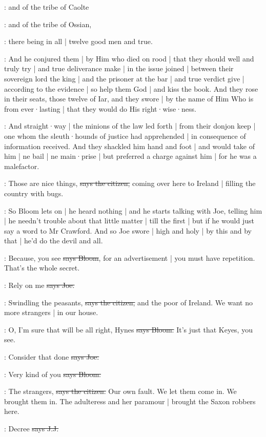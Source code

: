 :
and of the tribe of Caolte

:
and of the tribe of Ossian,

:
there being in all
 |
twelve good men and true.

:
And he conjured them |
by Him who died on rood |
that they should well and truly try |
and true deliverance make |
in the issue joined |
between their sovereign lord the king |
and the prisoner at the bar |
and true verdict give |
according to the evidence |
so help them God |
and kiss the book.
And they rose in their seats,
those twelve of Iar,
and they swore |
by the name of Him Who is from ever·lasting |
that they would do His right·wise·ness.

:
And straight·way |
the minions of the law led forth |
from their donjon keep |
one whom the sleuth·hounds of justice had apprehended |
in consequence of information received.
And they shackled him hand and foot |
and would take of him |
ne bail |
ne main·prise |
but preferred a charge against him
 |
for he was a malefactor.

\citizen:
Those are nice things,
\sout{says the citizen,}
coming over here to Ireland |
filling the country with bugs.

\Nq:
So Bloom lets on |
he heard nothing |
and he starts talking with Joe,
telling him |
he needn't trouble about that little matter |
till the first |
but if he would just say a word to Mr Crawford.
And so Joe swore |
high and holy |
by this and by that |
he'd do the devil and all.

\Bloom:
Because,
you see
\sout{says Bloom},
for an advertisement |
you must have repetition.
That's the whole secret.

\joe:
Rely on me
\sout{says Joe.}

\citizen:
Swindling the peasants,
\sout{says the citizen,}
and the poor of Ireland.
We want no more strangers |
in our house.

\Bloom:
O,
I'm sure that will be all right,
Hynes
\sout{says Bloom.}
It's just that Keyes,
you see.

\joe:
Consider that done
\sout{says Joe.}

\Bloom:
Very kind of you
\sout{says Bloom.}

\citizen:
The strangers,
\sout{says the citizen.}
Our own fault.
We let them come in.
We brought them in.
The adulteress and her paramour |
brought the Saxon robbers here.

\jjom:
Decree 
\sout{says J.J.}

